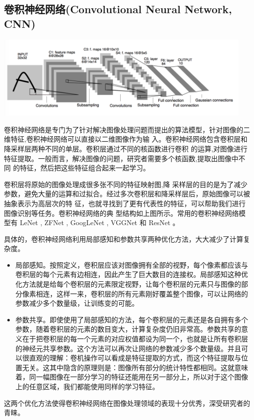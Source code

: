 \subsection{卷积神经网络(Convolutional Neural Network, CNN)}{
	\centerline{\includegraphics[width=5in]{figure/cnn.png}}
	卷积神经网络是专门为了针对解决图像处理问题而提出的算法模型，针对图像的二维特征,卷积神经网络可以直接以二维图像作为输 入。卷积神经网络包含卷积层和降采样层两种不同的单层。卷积层通过不同的核函数进行卷积 的运算,对图像进行特征提取。一般而言，解决图像的问题，研究者需要多个核函数,提取出图像中不同 的特征，然后把这些特征组合起来一起学习。
	
	卷积层将原始的图像处理成很多张不同的特征映射图,降 采样层的目的是为了减少参数，避免大量的运算和过拟合。经过多次卷积层和降采样层后，原始图像可以被抽象表示为高层次的特 征，也就寻找到了更有代表性的特征，可以帮助我们进行图像识别等任务。卷积神经网络的典 型结构如上图所示。常用的卷积神经网络模型有 LeNet ,  ZFNet , GoogLeNet , VGGNet 和 ResNet 。
	
	具体的，卷积神经网络利用局部感知和参数共享两种优化方法，大大减少了计算复杂度。
	\begin{itemize}
		\item 局部感知。按照定义，卷积层应该对图像拥有全部的视野，每个像素都应该与卷积层的每个元素有边相连，因此产生了巨大数目的连接权。局部感知这种优化方法就是给每个卷积层的元素限定视野，让每个卷积层的元素只与图像的部分像素相连，这样一来，卷积层的所有元素刚好覆盖整个图像，可以让网络的参数减少多个数量级，让训练变的可能。
		\item 参数共享。即使使用了局部感知的方法，每个卷积层的元素还是各自拥有多个参数，随着卷积层的元素的数目变大，计算复杂度仍旧非常高。参数共享的意义在于把卷积层的每一个元素的对应权值都设为同一个，也就是让所有卷积层的神经元共享参数。这个方法可以再次让网络的参数减少多个数量级。并且可以很直观的理解：卷机操作可以看成是特征提取的方式，而这个特征提取与位置无关。这其中隐含的原理则是：图像所有部分的统计特性都相同。这就意味着，同一幅图像在一部分学习的特征还能用在另一部分上，所以对于这个图像上的任意区域，我们都能使用同样的学习特征。
	\end{itemize}
	这两个优化方法使得卷积神经网络在图像处理领域的表现十分优秀，深受研究者的青睐。
}

